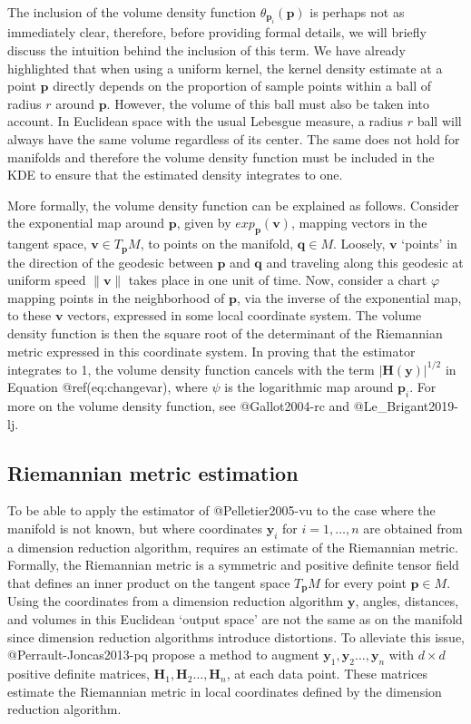 \documentclass[
]{article}
\begin{document}
The inclusion of the volume density function
\(\theta_{\bm{p}_i}(\bm{p})\) is perhaps not as immediately clear,
therefore, before providing formal details, we will briefly discuss the
intuition behind the inclusion of this term. We have already highlighted
that when using a uniform kernel, the kernel density estimate at a point
\(\bm{p}\) directly depends on the proportion of sample points within a
ball of radius \(r\) around \(\bm{p}\). However, the volume of this ball
must also be taken into account. In Euclidean space with the usual
Lebesgue measure, a radius \(r\) ball will always have the same volume
regardless of its center. The same does not hold for manifolds and
therefore the volume density function must be included in the KDE to
ensure that the estimated density integrates to one.

More formally, the volume density function can be explained as follows.
Consider the exponential map around \(\bm{p}\), given by
\(exp_{\bm{p}}(\bm{v})\), mapping vectors in the tangent space,
\(\bm{v}\in T_{\bm{p}}M\), to points on the manifold, \(\bm{q}\in M\).
Loosely, \(\bm{v}\) `points' in the direction of the geodesic between
\(\bm{p}\) and \(\bm{q}\) and traveling along this geodesic at uniform
speed \(\|\bm{v}\|\) takes place in one unit of time. Now, consider a
chart \(\varphi\) mapping points in the neighborhood of \(\bm{p}\), via
the inverse of the exponential map, to these \(\bm{v}\) vectors,
expressed in some local coordinate system. The volume density function
is then the square root of the determinant of the Riemannian metric
expressed in this coordinate system. In proving that the estimator
integrates to 1, the volume density function cancels with the term
\(|\bm{H}(\bm{y})|^{1/2}\) in Equation @ref(eq:changevar), where
\(\psi\) is the logarithmic map around \(\bm{p}_i\). For more on the
volume density function, see @Gallot2004-rc and @Le\_Brigant2019-lj.

\hypertarget{MetLearn}{%
\subsection{Riemannian metric estimation}\label{MetLearn}}

To be able to apply the estimator of @Pelletier2005-vu to the case where
the manifold is not known, but where coordinates \(\bm{y}_i\) for
\(i=1,\dots,n\) are obtained from a dimension reduction algorithm,
requires an estimate of the Riemannian metric. Formally, the Riemannian
metric is a symmetric and positive definite tensor field that defines an
inner product on the tangent space \(T_{\bm{p}} M\) for every point
\(\bm{p} \in M\). Using the coordinates from a dimension reduction
algorithm \(\bm{y}\), angles, distances, and volumes in this Euclidean
`output space' are not the same as on the manifold since dimension
reduction algorithms introduce distortions. To alleviate this issue,
@Perrault-Joncas2013-pq propose a method to augment
\(\bm{y}_1,\bm{y}_2\dots,\bm{y}_n\) with \(d\times d\) positive definite
matrices, \(\bm{H}_1,\bm{H}_2\dots,\bm{H}_n\), at each data point. These
matrices estimate the Riemannian metric in local coordinates defined by
the dimension reduction algorithm.
\end{document}
